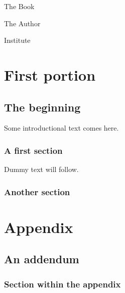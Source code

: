 \documentclass[fontsize=11pt,paper=a5,pagesize=auto]{scrbook}
\begin{document}
\begin{titlepage}
  \vspace*{1cm}
  {\huge\raggedright The Book\par}
  \noindent\hrulefill\par
  {\LARGE\raggedleft The Author\par}
  \vfill
  {\Large\raggedleft Institute\par}
\end{titlepage}
\tableofcontents 
\part{First portion}
\chapter{The beginning}
Some introductional text comes here.
\section{A first section}
Dummy text will follow.
\blindtext
\section{Another section}
\Blindtext
\appendix
\part{Appendix}
\chapter{An addendum}
\section{Section within the appendix}
\blindtext
\end{document}
